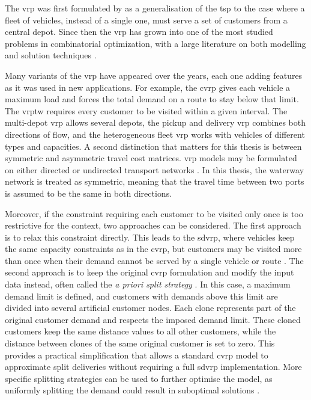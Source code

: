 \documentclass[12pt]{article}
\begin{document}
The \ac{vrp} was first formulated by \textcite{dantzig1959truck} as a generalisation of the \ac{tsp} to the case where a fleet of vehicles, instead of a single one, must serve a set of customers from a central depot. Since then the \ac{vrp} has grown into one of the most studied problems in combinatorial optimization, with a large literature on both modelling and solution techniques \parencite{VIDAL2020401}.

Many variants of the \ac{vrp} have appeared over the years, each one adding features as it was used in new applications. For example, the \acf{cvrp} gives each vehicle a maximum load and forces the total demand on a route to stay below that limit. The \ac{vrptw} requires every customer to be visited within a given interval. The multi-depot \ac{vrp} allows several depots, the pickup and delivery \ac{vrp} combines both directions of flow, and the heterogeneous fleet \ac{vrp} works with vehicles of different types and capacities. A second distinction that matters for this thesis is between symmetric and asymmetric travel cost matrices. \ac{vrp} models may be formulated on either directed or undirected transport networks \parencite{BRAEKERS2016300}. In this thesis, the waterway network is treated as symmetric, meaning that the travel time between two ports is assumed to be the same in both directions.

Moreover, if the constraint requiring each customer to be visited only once is too restrictive for the context, two approaches can be considered. The first approach is to relax this constraint directly. This leads to the \acf{sdvrp}, where vehicles keep the same capacity constraints as in the \ac{cvrp}, but customers may be visited more than once when their demand cannot be served by a single vehicle or route \parencite{ARCHETTI2011741}. The second approach is to keep the original \ac{cvrp} formulation and modify the input data instead, often called the \textit{a priori split strategy} \parencite{a17090396}. In this case, a maximum demand limit is defined, and customers with demands above this limit are divided into several artificial customer nodes. Each clone represents part of the original customer demand and respects the imposed demand limit. These cloned customers keep the same distance values to all other customers, while the distance between clones of the same original customer is set to zero. This provides a practical simplification that allows a standard \ac{cvrp} model to approximate split deliveries without requiring a full \ac{sdvrp} implementation. More specific splitting strategies can be used to further optimise the model, as uniformly splitting the demand could result in suboptimal solutions \parencite{a17090396}.
\end{document}
